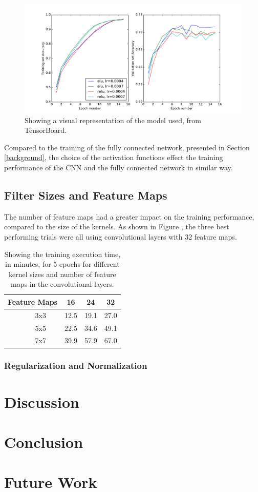 \documentclass[]{article}
\newcommand*\rot{\rotatebox{90}}
\begin{document}
\begin{figure}[h]
	\includegraphics[width=\textwidth]{ac_res}
	\caption{Showing a visual representation of the model used, from TensorBoard.}
	\label{ac_res}
	\centering
\end{figure}

Compared to the training of the fully connected network, presented in Section \ref{background}, the choice of the activation functions effect the training performance of the CNN and the fully connected network in similar way. 

\subsection{Filter Sizes and Feature Maps}

The number of feature maps had a greater impact on the training performance, compared to the size of the kernels. As shown in Figure , the three best performing trials were all using convolutional layers with 32 feature maps. 

\begin{table}[h]
	\centering
	\caption{Showing the training execution time, in minutes, for 5 epochs for different kernel sizes and number of feature maps in the convolutional layers.}
	\label{filter-res}
	\begin{tabular}{@{}ccccc@{}}
		\toprule
		\multicolumn{2}{c}{Feature Maps} & 16 & 24 & 32 \\ \midrule
		\multirow{3}{*}{\rot{Size}} & \multicolumn{1}{c|}{3x3} & 12.5 & 19.1 & 27.0 \\
		& \multicolumn{1}{c|}{5x5} & 22.5 & 34.6 & 49.1 \\
		& \multicolumn{1}{c|}{7x7} & 39.9 & 57.9 & 67.0 \\ \bottomrule
	\end{tabular}
\end{table}

\subsubsection{Regularization and Normalization}



\section{Discussion}


\section{Conclusion}

\section{Future Work}


\clearpage
\medskip


\end{document}
